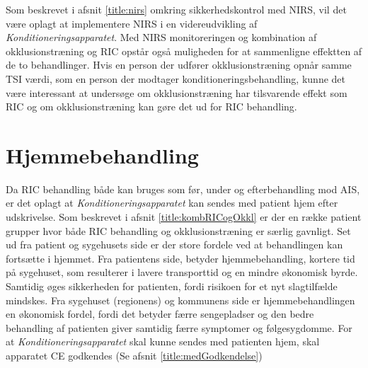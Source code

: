 Som beskrevet i afsnit \ref{title:nirs} omkring sikkerhedskontrol med NIRS, vil det være oplagt at implementere NIRS i en videreudvikling af \textit{Konditioneringsapparatet}. Med NIRS monitoreringen og kombination af okklusionstræning og RIC opstår også muligheden for at sammenligne effektten af de to behandlinger. Hvis en person der udfører okklusionstræning opnår samme TSI værdi, som en person der modtager konditioneringsbehandling, kunne det være interessant at undersøge om okklusionstræning har tilsvarende effekt som RIC og om okklusionstræning kan gøre det ud for RIC behandling. 

\section{Hjemmebehandling}\label{title:Hjemmebehandling}
Da RIC behandling både kan bruges som før, under og efterbehandling mod AIS, er det oplagt at \textit{Konditioneringsapparatet} kan sendes med patient hjem efter udskrivelse. Som beskrevet i afsnit \ref{title:kombRICogOkkl} er der en række patient grupper hvor både RIC behandling og okklusionstræning er særlig gavnligt. Set ud fra patient og sygehusets side er der store fordele ved at behandlingen kan fortsætte i hjemmet. Fra patientens side, betyder hjemmebehandling, kortere tid på sygehuset, som resulterer i lavere transporttid og en mindre økonomisk byrde. Samtidig øges sikkerheden for patienten, fordi risikoen for et nyt slagtilfælde mindskes. Fra sygehuset (regionens) og kommunens side er hjemmebehandlingen en økonomisk fordel, fordi det betyder færre sengepladser og den bedre behandling af patienten giver samtidig færre symptomer og følgesygdomme. 
For at \textit{Konditioneringsapparatet} skal kunne sendes med patienten hjem, skal apparatet CE godkendes (Se afsnit \ref{title:medGodkendelse})